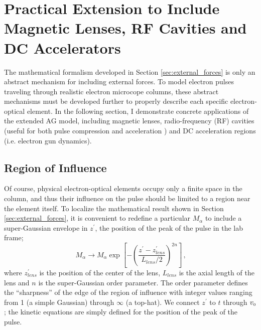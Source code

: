 
\section{Practical Extension to Include Magnetic Lenses, RF Cavities and DC Accelerators}

The mathematical formalism developed in Section \ref{sec:external_forces} is only an abstract mechanism for including external forces.
To model electron pulses traveling through realistic electron microcope columns, these abstract mechanisms must be developed further to properly describe each specific electron-optical element.
In the following section, I demonstrate concrete applications of the extended AG model, including magnetic lenses, radio-frequency (RF) cavities (useful for both pulse compression \cite{oudheusden_electron_2007} and acceleration %
) and DC acceleration regions (i.e. electron gun dynamics).

\subsection{Region of Influence}

Of course, physical electron-optical elements occupy only a finite space in the column, and thus their influence on the pulse should be limited to a region near the element itself.
To localize the mathematical result shown in Section \ref{sec:external_forces}, it is convenient to redefine a particular $M_{\alpha}$ to include a super-Gaussian envelope in $z^{\prime}$, the position of the peak of the pulse in the lab frame;
\begin{equation} \label{eq:reg_of_influence}
  M_{\alpha} \to M_{\alpha} \exp \left [ - \left (  \frac{ z^{\prime} - z_{lens}^{\prime} }{ L_{lens} / 2 } \right )^{ 2 n } \right ] \,\text{,}
\end{equation}
where $z_{lens}^{\prime}$ is the position of the center of the lens, $L_{lens}$ is the axial length of the lens and $n$ is the super-Gaussian order parameter.
The order parameter defines the ``sharpness'' of the edge of the region of influence with integer values ranging from 1 (a simple Gaussian) through $\infty$ (a top-hat).
We connect $z^{\prime}$ to $t$ through $ v_{{\scriptscriptstyle 0}} $; the kinetic equations are simply defined for the position of the peak of the pulse.

